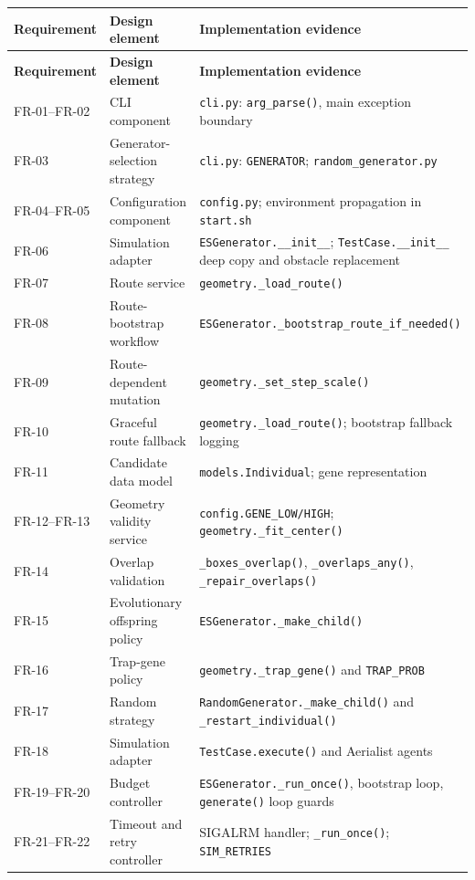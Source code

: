 \documentclass[11pt,a4paper,openany]{report}
\newcommand{\code}[1]{\texttt{#1}}
\begin{document}
\small
\begin{longtable}{L{2.3cm} L{4.2cm} L{7.7cm}}
\toprule
\textbf{Requirement} & \textbf{Design element} & \textbf{Implementation evidence}\\
\midrule
\endfirsthead
\toprule
\textbf{Requirement} & \textbf{Design element} & \textbf{Implementation evidence}\\
\midrule
\endhead
FR-01--FR-02 & CLI component & \code{cli.py}: \code{arg\_parse()}, main exception boundary\\
FR-03 & Generator-selection strategy & \code{cli.py}: \code{GENERATOR}; \code{random\_generator.py}\\
FR-04--FR-05 & Configuration component & \code{config.py}; environment propagation in \code{start.sh}\\
FR-06 & Simulation adapter & \code{ESGenerator.\_\_init\_\_}; \code{TestCase.\_\_init\_\_} deep copy and obstacle replacement\\
FR-07 & Route service & \code{geometry.\_load\_route()}\\
FR-08 & Route-bootstrap workflow & \code{ESGenerator.\_bootstrap\_route\_if\_needed()}\\
FR-09 & Route-dependent mutation & \code{geometry.\_set\_step\_scale()}\\
FR-10 & Graceful route fallback & \code{geometry.\_load\_route()}; bootstrap fallback logging\\
FR-11 & Candidate data model & \code{models.Individual}; gene representation\\
FR-12--FR-13 & Geometry validity service & \code{config.GENE\_LOW/HIGH}; \code{geometry.\_fit\_center()}\\
FR-14 & Overlap validation & \code{\_boxes\_overlap()}, \code{\_overlaps\_any()}, \code{\_repair\_overlaps()}\\
FR-15 & Evolutionary offspring policy & \code{ESGenerator.\_make\_child()}\\
FR-16 & Trap-gene policy & \code{geometry.\_trap\_gene()} and \code{TRAP\_PROB}\\
FR-17 & Random strategy & \code{RandomGenerator.\_make\_child()} and \code{\_restart\_individual()}\\
FR-18 & Simulation adapter & \code{TestCase.execute()} and Aerialist agents\\
FR-19--FR-20 & Budget controller & \code{ESGenerator.\_run\_once()}, bootstrap loop, \code{generate()} loop guards\\
FR-21--FR-22 & Timeout and retry controller & SIGALRM handler; \code{\_run\_once()}; \code{SIM\_RETRIES}\\

\end{longtable}
\end{document}
